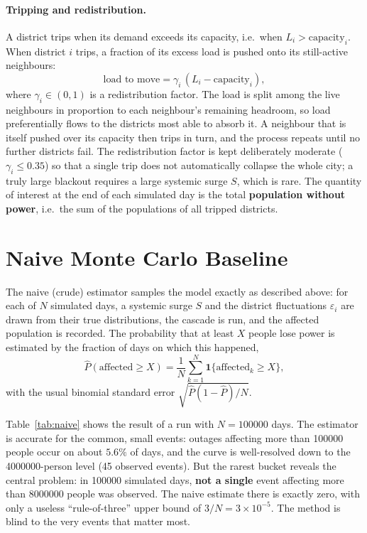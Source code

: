 \documentclass[11pt,a4paper]{article}
\begin{document}
\paragraph{Tripping and redistribution.}
A district trips when its demand exceeds its capacity, i.e.\ when
$L_i > \text{capacity}_i$. When district $i$ trips, a fraction of its excess load
is pushed onto its still-active neighbours:
\begin{equation}
    \text{load to move} = \gamma_i \,(L_i - \text{capacity}_i),
\end{equation}
where $\gamma_i \in (0,1)$ is a redistribution factor. The load is split among
the live neighbours in proportion to each neighbour's remaining headroom, so
load preferentially flows to the districts most able to absorb it. A neighbour
that is itself pushed over its capacity then trips in turn, and the process
repeats until no further districts fail. The redistribution factor is kept
deliberately moderate ($\gamma_i \le 0.35$) so that a single trip does not
automatically collapse the whole city; a truly large blackout requires a large
systemic surge $S$, which is rare. The quantity of interest at the end of each
simulated day is the total \textbf{population without power}, i.e.\ the sum of
the populations of all tripped districts.

\section{Naive Monte Carlo Baseline}

The naive (crude) estimator samples the model exactly as described above:
for each of $N$ simulated days, a systemic surge $S$ and the district
fluctuations $\varepsilon_i$ are drawn from their true distributions, the cascade
is run, and the affected population is recorded. The probability that at least
$X$ people lose power is estimated by the fraction of days on which this
happened,
\begin{equation}
    \hat{P}(\text{affected} \ge X) = \frac{1}{N}\sum_{k=1}^{N} \mathbf{1}\{\text{affected}_k \ge X\},
\end{equation}
with the usual binomial standard error $\sqrt{\hat{P}(1-\hat{P})/N}$.

Table~\ref{tab:naive} shows the result of a run with $N = \num{100000}$ days.
The estimator is accurate for the common, small events: outages affecting more
than \num{100000} people occur on about $5.6\%$ of days, and the curve is
well-resolved down to the \num{4000000}-person level (45 observed events). But
the rarest bucket reveals the central problem: in \num{100000} simulated days,
\textbf{not a single} event affecting more than \num{8000000} people was
observed. The naive estimate there is exactly zero, with only a useless
``rule-of-three'' upper bound of $3/N = 3\times 10^{-5}$. The method is blind to
the very events that matter most.
\end{document}
